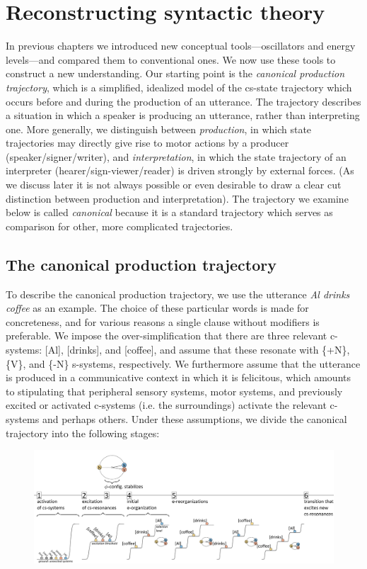 \chapter{Reconstructing syntactic theory}

In previous chapters we introduced new conceptual tools—oscillators and energy levels—and compared them to conventional ones. We now use these tools to construct a new understanding. Our starting point is the \textit{canonical production trajectory}, which is a simplified, idealized model of the cs-state trajectory which occurs before and during the production of an utterance. The trajectory describes a situation in which a speaker is producing an utterance, rather than interpreting one. More generally, we distinguish between \textit{production}, in which state trajectories may directly give rise to motor actions by a producer (speaker/signer/writer), and \textit{interpretation}, in which the state trajectory of an interpreter (hearer/sign-viewer/reader) is driven strongly by external forces. (As we discuss later it is not always possible or even desirable to draw a clear cut distinction between production and interpretation). The trajectory we examine below is called \textit{canonical} because it is a standard trajectory which serves as comparison for other, more complicated trajectories.

\section{The canonical production trajectory}

To describe the canonical production trajectory, we use the utterance \textit{Al drinks coffee} as an example. The choice of these particular words is made for concreteness, and for various reasons a single clause without modifiers is preferable. We impose the over-simplification that there are three relevant c-systems: [Al], [drinks], and [coffee], and assume that these resonate with \{+N\}, \{V\}, and \{-N\} s-systems, respectively. We furthermore assume that the utterance is produced in a communicative context in which it is felicitous, which amounts to stipulating that peripheral sensory systems, motor systems, and previously excited or activated c-systems (i.e. the surroundings) activate the relevant c-systems and perhaps others. Under these assumptions, we divide the canonical trajectory into the following stages:

  
\begin{figure}
\includegraphics[width=\textwidth]{figures/Tilsen-img51.png}
\caption{\missingcaption}
\label{fig:4:1}
\end{figure}
 

